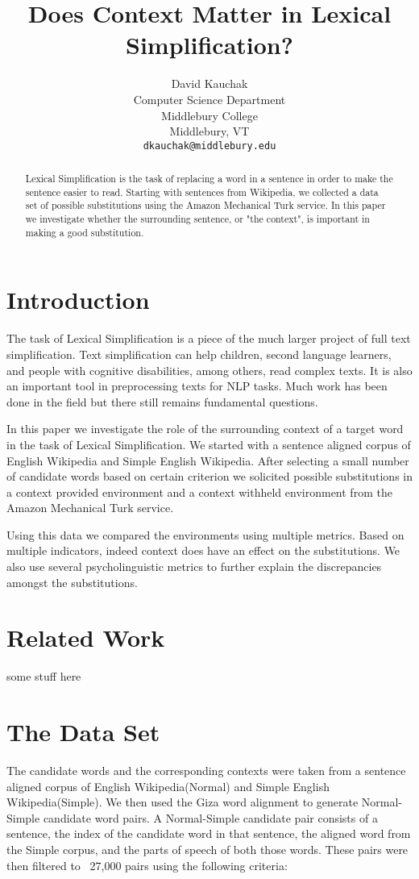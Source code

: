 \documentclass[11pt]{article}
\title{Does Context Matter in Lexical Simplification?}
\author{
	David Kauchak\\
	Computer Science Department\\
	Middlebury College\\
	Middlebury, VT\\
	{\tt dkauchak@middlebury.edu}
}
\date{}
\begin{document}
\maketitle

\begin{abstract}
Lexical Simplification is the task of replacing a word in a sentence in order to make the sentence easier to read. Starting with sentences from Wikipedia, we collected a data set of possible substitutions using the Amazon Mechanical Turk service. In this paper we investigate whether the surrounding sentence, or "the context", is important in making a good substitution. 
\end{abstract}

\section{Introduction}
The task of Lexical Simplification is a piece of the much larger project of full text simplification. Text simplification can help children, second language learners, and people with cognitive disabilities, among others, read complex texts. It is also an important  tool in preprocessing texts for NLP tasks. Much work has been done in the field but there still remains fundamental questions.

In this paper we investigate the role of the surrounding context of a target word in the task of Lexical Simplification. We started with a sentence aligned corpus of English Wikipedia and Simple English Wikipedia. After selecting a small number of candidate words based on certain criterion we solicited possible substitutions in a context provided environment and a context withheld environment from the Amazon Mechanical Turk service. 

Using this data we compared the environments using multiple metrics. Based on multiple indicators, indeed context does have an effect on the substitutions. We also use several psycholinguistic metrics to further explain the discrepancies amongst the substitutions.

\section{Related Work}

some stuff here

\section{The Data Set}
The candidate words and the corresponding contexts were taken from a sentence aligned corpus of English Wikipedia(Normal) and Simple English Wikipedia(Simple). We then used the Giza word alignment to generate Normal-Simple candidate word pairs. A Normal-Simple candidate pair consists of a sentence, the index of the candidate word in that sentence, the aligned word from the Simple corpus, and the parts of speech of both those words. These pairs were then filtered to ~27,000 pairs using the following criteria:
\end{document}

